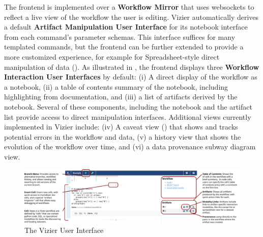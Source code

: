 The frontend is implemented over a \textbf{Workflow Mirror} that uses websockets to reflect a live view of the workflow the user is editing.
Vizier automatically derives a default \textbf{Artifact Manipulation User Interface} for its notebook interface from each command's parameter schemas. This interface suffices for many templated commands, but the frontend can be further extended to provide a more customized experience, for example for Spreadsheet-style direct manipulation of data ().
As illustrated in , the frontend displays three \textbf{Workflow Interaction User Interfaces} by default: (i) A direct display of the workflow as a notebook, (ii) a table of contents summary of the notebook, including highlighting from documentation, and (iii) a list of artifacts derived by the notebook.
Several of these components, including the notebook and the artifact list provide access to direct manipulation interfaces.
Additional views currently implemented in Vizier include: (iv) A caveat view () that shows and tracks potential errors in the workflow and data, (v) a history view that shows the evolution of the workflow over time, and (vi) a data provenance subway diagram view.

\begin{figure}
  \includegraphics[width=\textwidth]{graphics/screenshot.pdf} 
  \caption{The Vizier User Interface}
  \label{fig:screenshot}
\end{figure}

